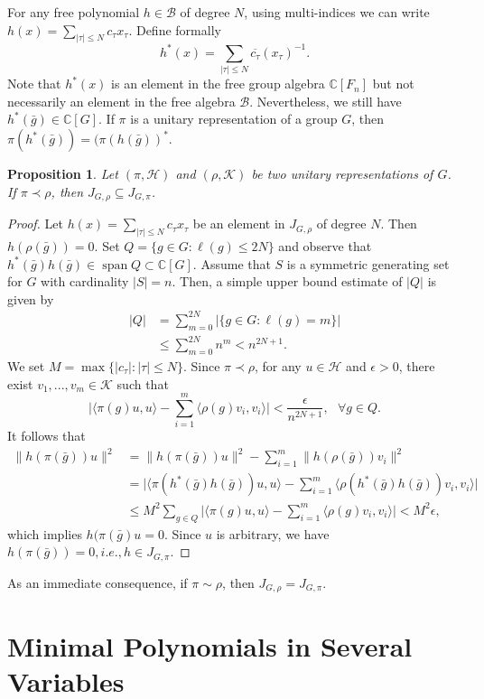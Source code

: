 \documentclass[draft, 12pt, reqno]{amsart}
\newcommand{\C}{{\mathbb C}}
\newcommand{\B}{{\mathcal B}}
\numberwithin{equation}{section}
\DeclareMathOperator{\SP}{span}
\theoremstyle{plain}
\newtheorem{proposition}[theorem]{Proposition}
\begin{document}
For any free polynomial $h\in \B$ of degree $N$, using multi-indices we can write $h(x)=\sum_{|\tau|\leq N}c_\tau x_\tau$. Define formally \[h^*(x)=\sum_{|\tau|\leq N}\overline{c_\tau} (x_\tau)^{-1}.\] Note that $h^*(x)$ is an element in the free group algebra $\C[F_n]$ but not necessarily an element in the free algebra $\B$. Nevertheless, we still have $h^*(\bar{g})\in \C[G]$. If $\pi$ is a unitary representation of a group $G$, then $\pi (h^*(\bar{g}))=(\pi (h(\bar{g}))^*$.
\begin{proposition}
Let $(\pi, {\mathcal H})$ and $(\rho, \mathcal{K})$ be two unitary representations of $G$. If $\pi\prec \rho$, then $J_{G,\rho}\subseteq J_{G,\pi}$.
\end{proposition}
\begin{proof}
Let $h(x)=\sum_{|\tau|\leq N}c_\tau x_\tau$ be an element in $J_{G,\rho}$ of degree $N$. Then $h(\rho(\bar{g}))=0$. Set $Q=\{g\in G: \ell (g)\leq 2N\}$ and observe that $h^*(\bar{g})h(\bar{g})\in \SP Q\subset \C[G]$. Assume that $S$ is a symmetric generating set for $G$ with cardinality $|S|=n$. Then, a simple upper bound estimate of $|Q|$ is given by
\begin{align*}
|Q|&=\sum_{m=0}^{2N}|\{g\in G: \ell (g)= m\}|\\
&\leq \sum_{m=0}^{2N}n^m<n^{2N+1}.
\end{align*}
We set $M=\max\{|c_\tau | : |\tau|\leq N\}$. Since $\pi\prec \rho$, for any $u\in {\mathcal H}$ and $\epsilon>0$, there exist $v_1, ..., v_m\in {\mathcal K}$ such that
\[\bigg|\langle \pi(g)u, u\rangle-\sum_{i=1}^m\langle \rho(g)v_i, v_i\rangle\bigg|<\frac{\epsilon}{n^{2N+1}},\ \ \ \forall g\in Q.\] It follows that
\begin{align*}
\|h(\pi(\bar{g}))u\|^2&=\|h(\pi(\bar{g}))u\|^2-\sum_{i=1}^m\|h(\rho(\bar{g}))v_i\|^2\\
&=\bigg|\langle \pi(h^*(\bar{g})h(\bar{g}))u, u\rangle-\sum_{i=1}^m\langle \rho(h^*(\bar{g})h(\bar{g}))v_i, v_i\rangle\bigg|\\
&\leq M^2\sum_{g\in Q}\bigg|\langle \pi(g)u, u\rangle-\sum_{i=1}^m\langle \rho(g)v_i, v_i\rangle\bigg|< M^2 \epsilon,
\end{align*}
which implies $h(\pi(\bar{g})u=0$. Since $u$ is arbitrary, we have $h(\pi(\bar{g}))=0, i.e., h\in J_{G,\pi}$.\end{proof}
\noindent As an immediate consequence, if $\pi\sim \rho$, then $J_{G,\rho}= J_{G,\pi}$.
 
\section{Minimal Polynomials in Several Variables}\label{min}
\end{document}
